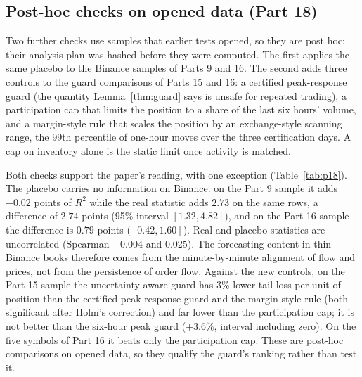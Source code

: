 \documentclass[12pt]{article}
\theoremstyle{definition}
\theoremstyle{remark}
\begin{document}
\subsection{Post-hoc checks on opened data (Part 18)}\label{sec:p18}
Two further checks use samples that earlier tests opened, so they are post hoc; their analysis plan was hashed before they were computed. The first applies the same placebo to the Binance samples of Parts 9 and 16. The second adds three controls to the guard comparisons of Parts 15 and 16: a certified peak-response guard (the quantity Lemma~\ref{thm:guard} says is unsafe for repeated trading), a participation cap that limits the position to a share of the last six hours' volume, and a margin-style rule that scales the position by an exchange-style scanning range, the 99th percentile of one-hour moves over the three certification days. A cap on inventory alone is the static limit once activity is matched.

Both checks support the paper's reading, with one exception (Table~\ref{tab:p18}). The placebo carries no information on Binance: on the Part 9 sample it adds $-0.02$ points of $R^2$ while the real statistic adds $2.73$ on the same rows, a difference of $2.74$ points (95\% interval $[1.32,4.82]$), and on the Part 16 sample the difference is $0.79$ points ($[0.42,1.60]$). Real and placebo statistics are uncorrelated (Spearman $-0.004$ and $0.025$). The forecasting content in thin Binance books therefore comes from the minute-by-minute alignment of flow and prices, not from the persistence of order flow. Against the new controls, on the Part 15 sample the uncertainty-aware guard has 3\% lower tail loss per unit of position than the certified peak-response guard and the margin-style rule (both significant after Holm's correction) and far lower than the participation cap; it is not better than the six-hour peak guard ($+3.6\%$, interval including zero). On the five symbols of Part 16 it beats only the participation cap. These are post-hoc comparisons on opened data, so they qualify the guard's ranking rather than test it.
\end{document}

